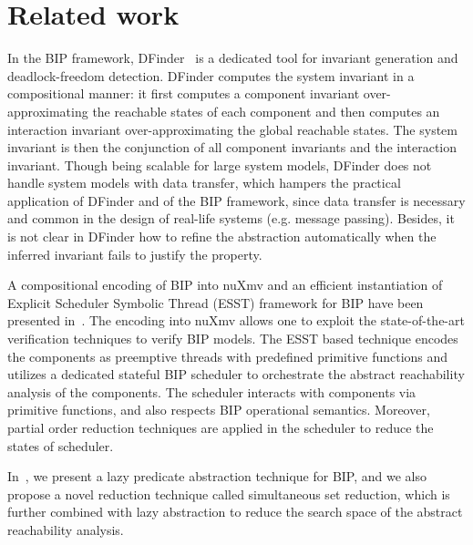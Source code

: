 

\section{Related work}


In the BIP framework, DFinder~\cite{dfinder10} is a dedicated tool for invariant generation and deadlock-freedom detection.
%
DFinder computes the system invariant in a compositional manner:
it first computes a component invariant over-approximating the reachable states of each component
and then computes an interaction invariant over-approximating the global reachable states.
The system invariant is then the conjunction of all component invariants and the interaction invariant.
%
Though being scalable for large system models,
DFinder does not handle system models with data transfer,
which hampers the practical application of DFinder and of the BIP framework,
since data transfer is necessary and common in the design of real-life systems (e.g. message passing).
%
Besides, it is not clear in DFinder how to refine the abstraction automatically
when the inferred invariant fails to justify the property.

A compositional encoding of BIP into nuXmv
 and an efficient instantiation of Explicit Scheduler Symbolic Thread (ESST) framework for BIP have been presented in~\cite{atva15}.
 The encoding into nuXmv allows one to exploit the state-of-the-art verification techniques to verify BIP models.
%
The ESST based technique encodes the components as preemptive threads with predefined primitive functions and
 utilizes a dedicated stateful BIP scheduler to orchestrate the abstract reachability analysis of the components.
 The scheduler interacts with components via primitive functions, and also respects BIP operational semantics.
 Moreover, partial order reduction techniques are applied in the scheduler to reduce the states of scheduler.

In~\cite{tgc15}, we present a lazy predicate abstraction technique for BIP, and
 we also propose a novel reduction technique called simultaneous set reduction,
 which is further combined with lazy abstraction to reduce the search space of the abstract reachability analysis.